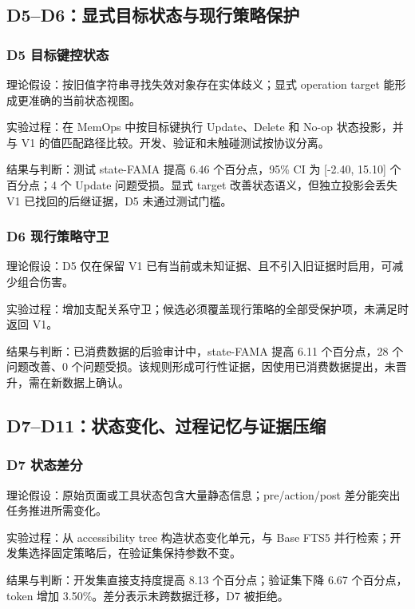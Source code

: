 \subsection{D5--D6：显式目标状态与现行策略保护}

\subsubsection{D5 目标键控状态}

理论假设：按旧值字符串寻找失效对象存在实体歧义；显式 operation target 能形成更准确的当前状态视图。

实验过程：在 MemOps 中按目标键执行 Update、Delete 和 No-op 状态投影，并与 V1 的值匹配路径比较。开发、验证和未触碰测试按协议分离。

结果与判断：测试 state-FAMA 提高 6.46 个百分点，95\% CI 为 [-2.40, 15.10] 个百分点；4 个 Update 问题受损。显式 target 改善状态语义，但独立投影会丢失 V1 已找回的后继证据，D5 未通过测试门槛。

\subsubsection{D6 现行策略守卫}

理论假设：D5 仅在保留 V1 已有当前或未知证据、且不引入旧证据时启用，可减少组合伤害。

实验过程：增加支配关系守卫；候选必须覆盖现行策略的全部受保护项，未满足时返回 V1。

结果与判断：已消费数据的后验审计中，state-FAMA 提高 6.11 个百分点，28 个问题改善、0 个问题受损。该规则形成可行性证据，因使用已消费数据提出，未晋升，需在新数据上确认。

\subsection{D7--D11：状态变化、过程记忆与证据压缩}

\subsubsection{D7 状态差分}

理论假设：原始页面或工具状态包含大量静态信息；pre/action/post 差分能突出任务推进所需变化。

实验过程：从 accessibility tree 构造状态变化单元，与 Base FTS5 并行检索；开发集选择固定策略后，在验证集保持参数不变。

结果与判断：开发集直接支持度提高 8.13 个百分点；验证集下降 6.67 个百分点，token 增加 3.50\%。差分表示未跨数据迁移，D7 被拒绝。

